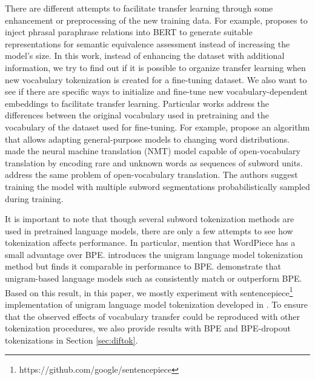 \documentclass[review]{elsarticle}
\begin{document}
There are different attempts to facilitate transfer learning through some enhancement or preprocessing of the new training data. For example, \cite{arase2019transfer} proposes to inject phrasal paraphrase relations into BERT to generate suitable representations for semantic equivalence assessment instead of increasing the model's size. In this work, instead of enhancing the dataset with additional information, we try to find out if it is possible to organize transfer learning when new vocabulary tokenization is created for a fine-tuning dataset. We also want to see if there are specific ways to initialize and fine-tune new vocabulary-dependent embeddings to facilitate transfer learning. Particular works address the differences between the original vocabulary used in pretraining and the vocabulary of the dataset used for fine-tuning. For example, \cite{bojanowski2019updating} propose an algorithm that allows adapting general-purpose models to changing word distributions. \cite{sennrich-etal-2016-neural} made the neural machine translation (NMT) model capable of open-vocabulary translation by encoding rare and unknown words as sequences of subword units. \cite{kudo2018subword} address the same problem of open-vocabulary translation. The authors suggest training the model with multiple subword segmentations probabilistically sampled during training. 

It is important to note that though several subword tokenization methods are used in pretrained language models, there are only a few attempts to see how tokenization affects performance. In particular, \cite{liu2019roberta}
mention that WordPiece \cite{schuster2012japanese} has a small advantage over BPE. \cite{kudo2018subword} introduces the unigram language model tokenization
method but finds it comparable in performance to
BPE. \cite{bostrom2020byte} demonstrate that unigram-based language models such as \cite{kudo2018sentencepiece} consistently match or outperform BPE. Based on this result, in this paper, we mostly experiment with sentencepiece\footnote{https://github.com/google/sentencepiece} implementation of unigram language model tokenization developed in \cite{kudo2018sentencepiece}. To ensure that the observed effects of vocabulary transfer could be reproduced with other tokenization procedures, we also provide results with BPE and BPE-dropout tokenizations in Section \ref{sec:diftok}.
\end{document}
